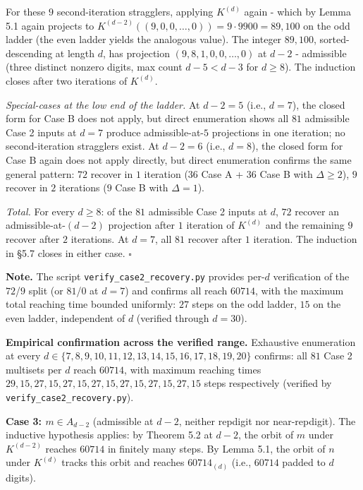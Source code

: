 \documentclass[11pt,letterpaper]{article}
\theoremstyle{paperstyle}
\theoremstyle{paperstyledef}
\theoremstyle{paperstylerem}
\begin{document}
For these \(9\) second-iteration stragglers, applying \(K^{(d)}\) again - which by Lemma 5.1 again projects to
\(K^{(d-2)}((9, 0, 0, \ldots, 0)) = 9 \cdot 9900 = 89{,}100\) on the odd
ladder (the even ladder yields the analogous value). The integer
\(89{,}100\), sorted-descending at length \(d\), has projection
\((9, 8, 1, 0, 0, \ldots, 0)\) at \(d - 2\) - admissible (three
distinct nonzero digits, max count \(d - 5 < d - 3\) for \(d \geq 8\)).
The induction closes after two iterations of \(K^{(d)}\).

\emph{Special-cases at the low end of the ladder.} At \(d - 2 = 5\)
(i.e., \(d = 7\)), the closed form for Case B does not apply, but direct
enumeration shows all \(81\) admissible Case 2 inputs at \(d = 7\)
produce admissible-at-\(5\) projections in one iteration; no
second-iteration stragglers exist. At \(d - 2 = 6\) (i.e., \(d = 8\)),
the closed form for Case B again does not apply directly, but direct
enumeration confirms the same general pattern: \(72\) recover in \(1\)
iteration (\(36\) Case A + \(36\) Case B with \(\Delta \geq 2\)), \(9\)
recover in \(2\) iterations (\(9\) Case B with \(\Delta = 1\)).

\emph{Total.} For every \(d \geq 8\): of the \(81\) admissible Case 2
inputs at \(d\), \(72\) recover an admissible-at-\((d-2)\) projection
after \(1\) iteration of \(K^{(d)}\) and the remaining \(9\) recover
after \(2\) iterations. At \(d = 7\), all \(81\) recover after \(1\)
iteration. The induction in §5.7 closes in either case. \(\square\)

\textbf{Note.} The script \texttt{verify\_case2\_recovery.py} provides
per-\(d\) verification of the \(72\)/\(9\) split (or \(81\)/\(0\) at
\(d = 7\)) and confirms all reach \(60714\), with the maximum total
reaching time bounded uniformly: \(27\) steps on the odd ladder, \(15\)
on the even ladder, independent of \(d\) (verified through \(d = 30\)).

\textbf{Empirical confirmation across the verified range.} Exhaustive
enumeration at every
\(d \in \{7, 8, 9, 10, 11, 12, 13, 14, 15, 16, 17, 18, 19, 20\}\)
confirms: all \(81\) Case 2 multisets per \(d\) reach \(60714\), with
maximum reaching times
\(29, 15, 27, 15, 27, 15, 27, 15, 27, 15, 27, 15, 27, 15\) steps
respectively (verified by \texttt{verify\_case2\_recovery.py}).

\textbf{Case 3: \(m \in A_{d-2}\)} (admissible at \(d - 2\), neither
repdigit nor near-repdigit). The inductive hypothesis applies: by
Theorem 5.2 at \(d - 2\), the orbit of \(m\) under \(K^{(d-2)}\) reaches
\(60714\) in finitely many steps. By Lemma 5.1, the orbit of \(n\) under
\(K^{(d)}\) tracks this orbit and reaches \(60714_{(d)}\) (i.e.,
\(60714\) padded to \(d\) digits).
\end{document}
